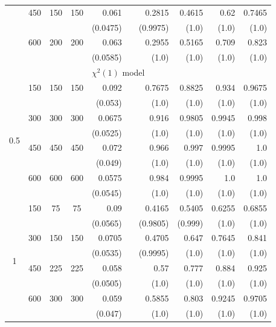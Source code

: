 \begin{table}[htbp]
\begin{tabular}{ccccrrrrrr}
            & 450 & 150 & 150 & 0.061 &       & 0.2815 & 0.4615 & 0.62 & 0.7465 \\
            &     &     &     & (0.0475) &       & (0.9975) & (1.0) & (1.0) & (1.0) \\
            & 600 & 200 & 200 & 0.063 &       & 0.2955 & 0.5165 & 0.709 & 0.823 \\
            &     &     &     & (0.0585) &       & (1.0) & (1.0) & (1.0) & (1.0) \\
            \midrule
        &   &     &     & \multicolumn{6}{l}{$\chi^2(1)$ model} \\
        \multirow{8}{*}{0.5}
            & 150 & 150 & 150 & 0.092 &       & 0.7675 & 0.8825 & 0.934 & 0.9675 \\
            &     &     &     & (0.053) &       & (1.0) & (1.0) & (1.0) & (1.0) \\
            & 300 & 300 & 300 & 0.0675 &       & 0.916 & 0.9805 & 0.9945 & 0.998 \\
            &     &     &     & (0.0525) &       & (1.0) & (1.0) & (1.0) & (1.0) \\
            & 450 & 450 & 450 & 0.072 &       & 0.966 & 0.997 & 0.9995 & 1.0 \\
            &     &     &     & (0.049) &       & (1.0) & (1.0) & (1.0) & (1.0) \\
            & 600 & 600 & 600 & 0.0575 &       & 0.984 & 0.9995 & 1.0 & 1.0 \\
            &     &     &     & (0.0545) &       & (1.0) & (1.0) & (1.0) & (1.0) \\
            \midrule
        \multirow{8}{*}{1}
            & 150 & 75 & 75 & 0.09 &       & 0.4165 & 0.5405 & 0.6255 & 0.6855 \\
            &     &     &     & (0.0565) &       & (0.9805) & (0.999) & (1.0) & (1.0) \\
            & 300 & 150 & 150 & 0.0705 &       & 0.4705 & 0.647 & 0.7645 & 0.841 \\
            &     &     &     & (0.0535) &       & (0.9995) & (1.0) & (1.0) & (1.0) \\
            & 450 & 225 & 225 & 0.058 &       & 0.57 & 0.777 & 0.884 & 0.925 \\
            &     &     &     & (0.0505) &       & (1.0) & (1.0) & (1.0) & (1.0) \\
            & 600 & 300 & 300 & 0.059 &       & 0.5855 & 0.803 & 0.9245 & 0.9705 \\
            &     &     &     & (0.047) &       & (1.0) & (1.0) & (1.0) & (1.0) \\

\end{tabular}
\end{table}
